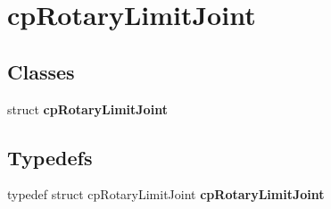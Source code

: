 \hypertarget{group__cp_rotary_limit_joint}{\section{cp\-Rotary\-Limit\-Joint}
\label{group__cp_rotary_limit_joint}
}
\subsection*{Classes}
\begin{DoxyCompactItemize}
\item 
struct {\bfseries cp\-Rotary\-Limit\-Joint}
\end{DoxyCompactItemize}
\subsection*{Typedefs}
\begin{DoxyCompactItemize}
\item 
\hypertarget{group__cp_rotary_limit_joint_ga53577b73517e279f29f637b00f83053b}{typedef struct cp\-Rotary\-Limit\-Joint {\bfseries cp\-Rotary\-Limit\-Joint}}\label{group__cp_rotary_limit_joint_ga53577b73517e279f29f637b00f83053b}

\end{DoxyCompactItemize}
